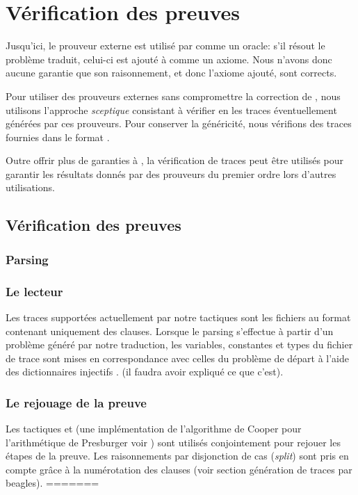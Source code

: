 \section{Vérification des preuves \tff}
\label{sec:traces}

Jusqu'ici, le prouveur externe est utilisé par \holfour comme un
oracle: s'il résout le problème traduit, celui-ci est ajouté à \holfour
comme un axiome. Nous n'avons donc aucune garantie que son raisonnement,
et donc l'axiome ajouté, sont corrects.

Pour utiliser des prouveurs externes sans compromettre la correction de
\holfour, nous utilisons l'approche \emph{sceptique} consistant à
vérifier en \holfour les traces éventuellement générées par ces
prouveurs. Pour conserver la généricité, nous vérifions des traces
fournies dans le format \tff.

Outre offrir plus de garanties à \holfour, la vérification de traces
\tff peut être utilisés pour garantir les résultats donnés par des
prouveurs du premier ordre lors d'autres utilisations.


\subsection{Vérification des preuves}
\subsubsection{Parsing}

\subsubsection{Le lecteur}
Les traces supportées actuellement par notre tactiques sont les fichiers
au format \tff contenant uniquement des clauses. Lorsque le parsing
s'effectue à partir d'un problème généré par notre traduction, les
variables, constantes et types du fichier de trace sont mises en
correspondance avec celles du problème de départ à l'aide des
dictionnaires injectifs \holfour. (\todo il faudra avoir expliqué ce que c'est).

\subsubsection{Le rejouage de la preuve}
Les tactiques \metistac et \coopertac (une implémentation de l'algorithme de Cooper pour l'arithmétique de Presburger voir \cite{Norrish03completeinteger})
sont utilisés conjointement pour rejouer les étapes de la preuve. 
Les raisonnements par disjonction de cas (\textit{split}) sont pris en compte grâce à la numérotation des clauses (voir section génération de traces par beagles).
=======



